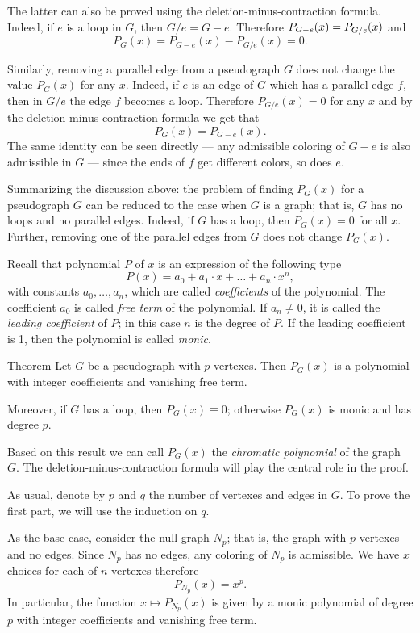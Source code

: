 The latter can also be proved using the deletion-minus-contraction formula.
Indeed, if $e$ is a loop in $G$, then $G/e=G- e$.
Therefore $P_{G- e}(x)\z=P_{G/e}(x)$ and
\[P_G(x)=P_{G- e}(x)-P_{G/e}(x) =0.\]

Similarly, removing a parallel edge from a pseudograph $G$ does not change the value $P_G(x)$ for any $x$.
Indeed, if $e$ is an edge of $G$ which has a parallel edge $f$, then in $G/e$ the edge $f$ becomes a loop.
Therefore $P_{G/e}(x)=0$ for any $x$ and by the deletion-minus-contraction formula we get that
\[P_G(x)=P_{G- e}(x).\]
The same identity can be seen directly --- any admissible coloring of $G- e$ is also admissible in $G$ --- since the ends of $f$ get different colors, so does $e$. 

Summarizing the discussion above:
the problem of finding $P_G(x)$ for a pseudograph $G$ can be reduced to the case when $G$ is a graph; that is, $G$ has no loops and no parallel edges.
Indeed, if $G$ has a loop, then $P_G(x)=0$ for all $x$.
Further, removing one of the parallel edges from $G$ does not change $P_G(x)$.

Recall that polynomial $P$ of $x$ is an expression of the following type
\[P(x)=a_0+a_1\cdot x+\dots+a_n\cdot x^n,\]
with constants $a_0,\dots, a_n$, which are called {}\emph{coefficients} of the polynomial.
The coefficient $a_0$ is called \emph{free term} of the polynomial.
If $a_n\ne 0$, it is called the \emph{leading coefficient} of $P$;
in this case $n$ is the degree of $P$.
If the leading coefficient is 1, then the polynomial is called \emph{monic}.

\begin{thm}{Theorem}\label{thm:chromatic-polynomial}
Let $G$ be a pseudograph with $p$ vertexes.
Then $P_G(x)$ is a polynomial with integer coefficients and vanishing free term.

Moreover, if $G$ has a loop, then $P_G(x)\equiv 0$;
otherwise $P_G(x)$ is monic and has degree $p$.
\end{thm}

Based on this result we can call $P_G(x)$ the \emph{chromatic polynomial} of the graph~$G$.
The deletion-minus-contraction formula will play the central role in the proof.

As usual, denote by $p$ and $q$ the number of vertexes and edges in $G$.
To prove the first part, we will use the induction on $q$.

As the base case, consider the null graph $N_p$;
that is, the graph with $p$ vertexes and no edges.
Since $N_p$ has no edges, any coloring of $N_p$ is admissible.
We have $x$ choices for each of $n$ vertexes therefore
\[P_{N_p}(x)=x^p.\]
In particular, the function $x\mapsto P_{N_p}(x)$ is given by a monic polynomial of degree $p$ with integer coefficients and vanishing free term.

